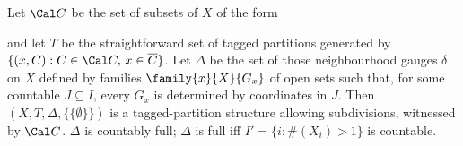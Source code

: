 Let $\Cal C$ be the set of subsets of $X$ of the form


\noindent and let $T$ be the straightforward set of tagged partitions
generated by $\{(x,C):C\in\Cal C,\,x\in\overline{C}\}$.   Let
$\Delta$ be the set of those neighbourhood gauges $\delta$ on $X$
defined by families $\family{x}{X}{G_x}$ of open sets such that, for
some countable $J\subseteq I$, every $G_x$ is determined by coordinates
in $J$.   Then
$(X,T,\Delta,\{\{\emptyset\}\})$ is a tagged-partition structure
allowing subdivisions, witnessed by $\Cal C$.    $\Delta$ is countably
full;  $\Delta$ is full iff $I'=\{i:\#(X_i)>1\}$ is countable.

